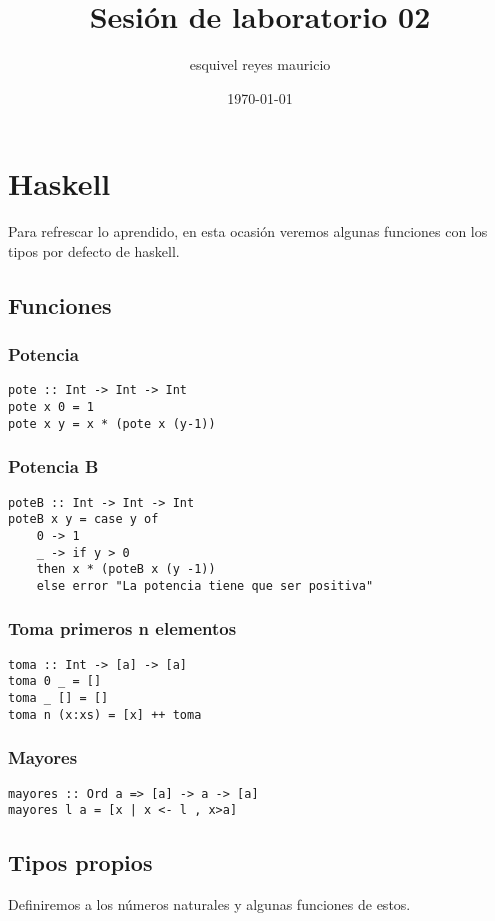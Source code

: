 \documentclass[11pt]{article}
\author{esquivel reyes mauricio}
\date{\today}
\title{Sesión de laboratorio 02}
\begin{document}
\maketitle
\tableofcontents

\section{Haskell}
\label{sec-1}
Para refrescar lo aprendido, en esta ocasión veremos algunas funciones con los
tipos por defecto de haskell.
\subsection{Funciones}
\label{sec-1-1}
\subsubsection{Potencia}
\label{sec-1-1-1}
\begin{verbatim}
pote :: Int -> Int -> Int
pote x 0 = 1
pote x y = x * (pote x (y-1))
\end{verbatim}
\subsubsection{Potencia B}
\label{sec-1-1-2}
\begin{verbatim}
poteB :: Int -> Int -> Int
poteB x y = case y of 
	0 -> 1
	_ -> if y > 0 
	then x * (poteB x (y -1))
	else error "La potencia tiene que ser positiva"
\end{verbatim}
\subsubsection{Toma primeros n elementos}
\label{sec-1-1-3}
\begin{verbatim}
toma :: Int -> [a] -> [a]
toma 0 _ = []
toma _ [] = []
toma n (x:xs) = [x] ++ toma
\end{verbatim}
\subsubsection{Mayores}
\label{sec-1-1-4}
\begin{verbatim}
mayores :: Ord a => [a] -> a -> [a]
mayores l a = [x | x <- l , x>a]
\end{verbatim}

\subsection{Tipos propios}
\label{sec-1-2}
Definiremos a los números naturales y algunas funciones de estos.
\end{document}
